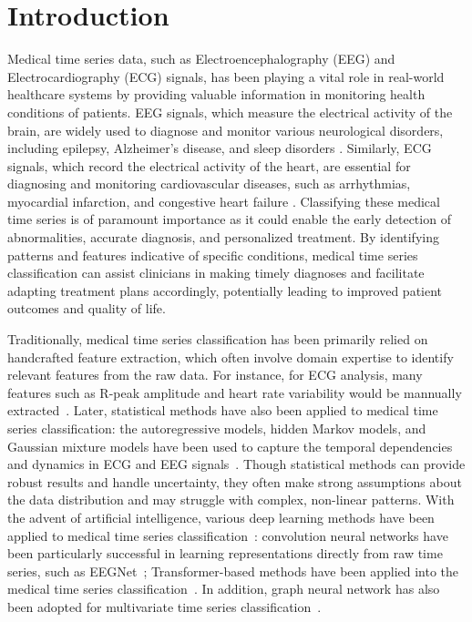 \vspace{-2mm}
\section{Introduction}
Medical time series data, such as Electroencephalography (EEG) and Electrocardiography (ECG) signals, has been playing a vital role in real-world healthcare systems by providing valuable information in monitoring health conditions of patients. 
EEG signals, which measure the electrical activity of the brain, are widely used to diagnose and monitor various neurological disorders, including epilepsy, Alzheimer's disease, and sleep disorders \cite{cohen2017does}. Similarly, ECG signals, which record the electrical activity of the heart, are essential for diagnosing and monitoring cardiovascular diseases, such as arrhythmias, myocardial infarction, and congestive heart failure \cite{berkaya2018survey}. Classifying these medical time series is of paramount importance as it could enable the early detection of abnormalities, accurate diagnosis, and personalized treatment. By identifying patterns and features indicative of specific conditions, medical time series classification can assist clinicians in making timely diagnoses \cite{ismail2019deep} and facilitate adapting treatment plans accordingly, potentially leading to improved patient outcomes and quality of life.

Traditionally, medical time series classification has been primarily relied on handcrafted feature extraction, which often involve domain expertise to identify relevant features from the raw data. For instance, for ECG analysis, many features such as R-peak amplitude and heart rate variability would be mannually extracted~\cite{berkaya2018survey}.  %
Later, statistical methods have also been applied to medical time series classification: the autoregressive models, hidden Markov models, and Gaussian mixture models have been used to capture the temporal dependencies and dynamics in ECG and EEG signals~\cite{schaffer2021interrupted,vincent2010spatially,turner2020design}. Though statistical methods can provide robust results and handle uncertainty, they often make strong assumptions about the data distribution and may struggle with complex, non-linear patterns. 
With the advent of artificial intelligence, various deep learning methods have been applied to medical time series classification~\cite{morid2023time}: convolution neural networks have been particularly successful in learning representations directly from raw time series, such as EEGNet~\cite{eegnet_2016}; Transformer-based methods have been applied into the medical time series classification~\cite{medformer_2024}. In addition, graph neural network has also been adopted for multivariate time series classification~\cite{ZhaLZH22,YounisHA24}.


